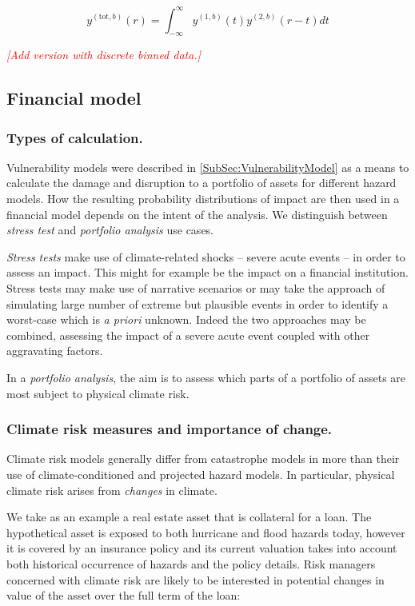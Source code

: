 \documentclass[a4paper,11pt]{extarticle} %
\begin{document}
\begin{equation}
    \label{Eq:sampling}
    y^{(\text{tot}, b)}(r) = \int^{\infty}_{-\infty} y^{(1, b)}(t) y^{(2, b)}(r - t) dt
\end{equation}

{\textcolor{red}{\emph{[Add version with discrete binned data.]}}}

\subsection{Financial model}

\subsubsection{Types of calculation.}
Vulnerability models were described in \ref{SubSec:VulnerabilityModel} as a means to calculate the damage and disruption to a portfolio of assets for different hazard models. How the resulting probability distributions of impact are then used in a financial model depends on the intent of the analysis. We distinguish between \emph{stress test} and \emph{portfolio analysis} use cases.

\emph{Stress tests} make use of climate-related shocks -- severe acute events -- in order to assess an impact. This might for example be the impact on a financial institution. Stress tests may make use of narrative scenarios or may take the approach of simulating large number of extreme but plausible events in order to identify a worst-case which is \emph{a priori} unknown. Indeed the two approaches may be combined, assessing the impact of a severe acute event coupled with other aggravating factors.

In a \emph{portfolio analysis}, the aim is to assess which parts of a portfolio of assets are most subject to physical climate risk.

\subsubsection{Climate risk measures and importance of change.}
Climate risk models generally differ from catastrophe models in more than their use of climate-conditioned and projected hazard models. In particular, physical climate risk arises from \emph{changes} in climate.

We take as an example a real estate asset that is collateral for a loan. The hypothetical asset is exposed to both hurricane and flood hazards today, however it is covered by an insurance policy and its current valuation takes into account both historical occurrence of hazards and the policy details. Risk managers concerned with climate risk are likely to be interested in potential changes in value of the asset over the full term of the loan:
\end{document}

